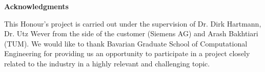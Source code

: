 \clearemptydoublepage
{}
{}	



\vspace*{2cm}

\begin{center}
{\Large \bf Acknowledgments}
\end{center}

\vspace{1cm}

This Honour's project is carried out under the supervision of Dr. Dirk Hartmann, Dr. Utz Wever  from the side of the customer (Siemens AG) and Arash Bakhtiari (TUM). We would like to thank Bavarian Graduate School of Computational Engineering for providing us an opportunity to participate in a project closely related to the industry in a highly relevant and challenging topic.